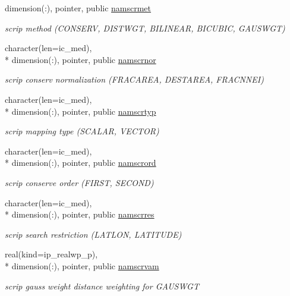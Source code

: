 \begin{DoxyCompactItemize}
dimension(\+:), pointer, public \hyperlink{classmod__oasis__namcouple_a51c19e0892a72acc3dca2adb046ed175}{namscrmet}
\begin{DoxyCompactList}\small\item\em scrip method (C\+O\+N\+S\+E\+R\+V, D\+I\+S\+T\+W\+G\+T, B\+I\+L\+I\+N\+E\+A\+R, B\+I\+C\+U\+B\+I\+C, G\+A\+U\+S\+W\+G\+T) \end{DoxyCompactList}\item 
character(len=ic\+\_\+med), \\*
dimension(\+:), pointer, public \hyperlink{classmod__oasis__namcouple_a392f40531007d5dcc084e6ad4a393fd7}{namscrnor}
\begin{DoxyCompactList}\small\item\em scrip conserv normalization (F\+R\+A\+C\+A\+R\+E\+A, D\+E\+S\+T\+A\+R\+E\+A, F\+R\+A\+C\+N\+N\+E\+I) \end{DoxyCompactList}\item 
character(len=ic\+\_\+med), \\*
dimension(\+:), pointer, public \hyperlink{classmod__oasis__namcouple_a8ddbaabd22bbf485888b1df5f3578909}{namscrtyp}
\begin{DoxyCompactList}\small\item\em scrip mapping type (S\+C\+A\+L\+A\+R, V\+E\+C\+T\+O\+R) \end{DoxyCompactList}\item 
character(len=ic\+\_\+med), \\*
dimension(\+:), pointer, public \hyperlink{classmod__oasis__namcouple_ac881ced105604879ada860fabd677481}{namscrord}
\begin{DoxyCompactList}\small\item\em scrip conserve order (F\+I\+R\+S\+T, S\+E\+C\+O\+N\+D) \end{DoxyCompactList}\item 
character(len=ic\+\_\+med), \\*
dimension(\+:), pointer, public \hyperlink{classmod__oasis__namcouple_a6a95ddbbbc615e0257d93d05e4546239}{namscrres}
\begin{DoxyCompactList}\small\item\em scrip search restriction (L\+A\+T\+L\+O\+N, L\+A\+T\+I\+T\+U\+D\+E) \end{DoxyCompactList}\item 
real(kind=ip\+\_\+realwp\+\_\+p), \\*
dimension(\+:), pointer, public \hyperlink{classmod__oasis__namcouple_a45b410743ce74a9824d44b329ba323ba}{namscrvam}
\begin{DoxyCompactList}\small\item\em scrip gauss weight distance weighting for G\+A\+U\+S\+W\+G\+T \end{DoxyCompactList}\item 

\end{DoxyCompactItemize}
